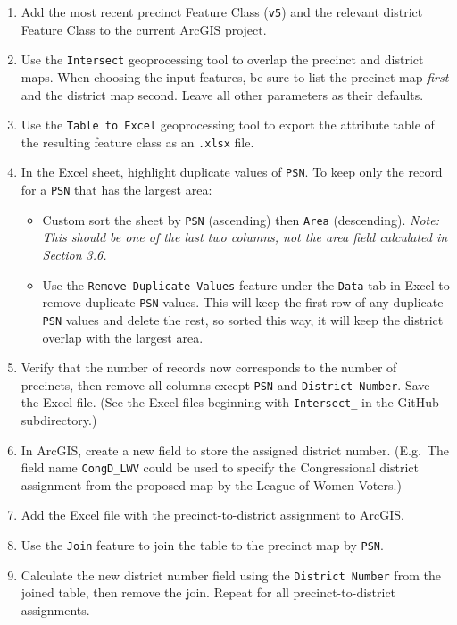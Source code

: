 \documentclass[11pt]{article}
\begin{document}
\begin{enumerate}
	\item Add the most recent precinct Feature Class (\verb|v5|) and the relevant district Feature Class to the current ArcGIS project.
	\item Use the \verb|Intersect| geoprocessing tool to overlap the precinct and district maps. When choosing the input features, be sure to list the precinct map \textit{first} and the district map second. Leave all other parameters as their defaults.
	\item Use the \verb|Table to Excel| geoprocessing tool to export the attribute table of the resulting feature class as an \verb|.xlsx| file. 
	\item In the Excel sheet, highlight duplicate values of \verb|PSN|. To keep only the record for a \verb|PSN| that has the largest area:
	\begin{itemize}
		\item Custom sort the sheet by \verb|PSN| (ascending) then \verb|Area| (descending). \textit{Note: This should be one of the last two columns, not the area field calculated in Section 3.6.}
		\item Use the \verb|Remove Duplicate Values| feature under the \verb|Data| tab in Excel to remove duplicate \verb|PSN| values. This will keep the first row of any duplicate \verb|PSN| values and delete the rest, so sorted this way, it will keep the district overlap with the largest area.
\end{itemize}	 
	\item Verify that the number of records now corresponds to the number of precincts, then remove all columns except \verb|PSN| and \verb|District Number|. Save the Excel file. (See the Excel files beginning with \verb|Intersect_| in the GitHub subdirectory.)
	\item In ArcGIS, create a new field to store the assigned district number. (E.g.\ The field name \verb|CongD_LWV| could be used to specify the Congressional district assignment from the proposed map by the League of Women Voters.)
	\item Add the Excel file with the precinct-to-district assignment to ArcGIS.
	\item Use the \verb|Join| feature to join the table to the precinct map by \verb|PSN|. 
	\item Calculate the new district number field using the \verb|District Number| from the joined table, then remove the join. Repeat for all precinct-to-district assignments.
\end{enumerate}
\end{document}
